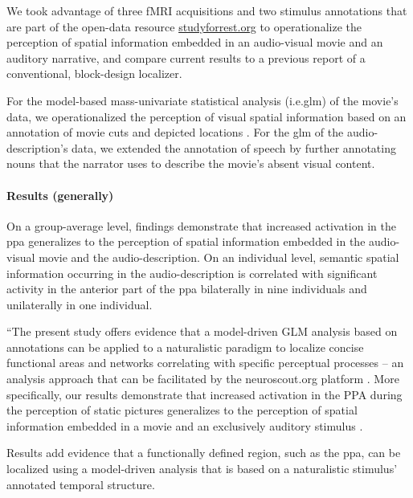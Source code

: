 We took advantage of three fMRI acquisitions and two stimulus annotations that
are part of the open-data resource
\href{http://www.studyforrest.org}{studyforrest.org} to operationalize the
perception of spatial information embedded in an audio-visual movie and an
auditory narrative, and compare current results to a previous report of a
conventional, block-design localizer.


For the model-based mass-univariate statistical analysis (i.e.\ac{glm}) of the
movie's data, we operationalized the perception of visual spatial information
based on an annotation of movie cuts and depicted locations
\citep{haeusler2016cutanno}.
For the \ac{glm} of the audio-description's data, we extended the annotation of
speech \citep{haeusler2021speechanno} by further annotating nouns that the
narrator uses to describe the movie's absent visual content.


\paragraph{Results (generally)}

On a group-average level, findings demonstrate that increased activation in the
\ac{ppa} generalizes to the perception of spatial information embedded in the
audio-visual movie and the audio-description.
On an individual level, semantic spatial information occurring in the
audio-description is correlated with significant activity in the anterior part
of the \ac{ppa} bilaterally in nine individuals and unilaterally in one
individual.

``The present study offers evidence that a model-driven GLM analysis based on
annotations can be applied to a naturalistic paradigm to localize concise
functional areas and networks correlating with specific perceptual processes --
an analysis approach that can be facilitated by the neuroscout.org platform
\citep{delavega2021neuroscout}.
More specifically, our results demonstrate that increased activation in the PPA
during the perception of static pictures generalizes to the perception of
spatial information embedded in a movie and an exclusively auditory stimulus
\citep{haeusler2022processing}.

Results add evidence \citep[cf.][]{bartels2004mapping} that a functionally
defined region, such as the \ac{ppa}, can be localized using a model-driven
analysis that is based on a naturalistic stimulus' annotated temporal structure.


